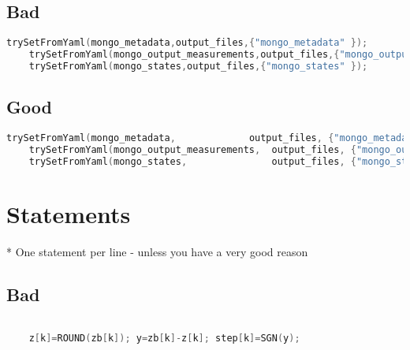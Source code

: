 
\subsection{Bad}

\begin{lstlisting}[language=c++]
    trySetFromYaml(mongo_metadata,output_files,{"mongo_metadata" });
    trySetFromYaml(mongo_output_measurements,output_files,{"mongo_output_measurements" });
    trySetFromYaml(mongo_states,output_files,{"mongo_states" });
\end{lstlisting}

\subsection{Good}
\begin{lstlisting}[language=c++]
    trySetFromYaml(mongo_metadata,             output_files, {"mongo_metadata"              });
    trySetFromYaml(mongo_output_measurements,  output_files, {"mongo_output_measurements"	});
    trySetFromYaml(mongo_states,               output_files, {"mongo_states"		        });
\end{lstlisting}

\section{Statements}

* One statement per line  - \*unless you have a very good reason

\subsection{Bad}
\begin{lstlisting}[language=c++]

    z[k]=ROUND(zb[k]); y=zb[k]-z[k]; step[k]=SGN(y);
\end{lstlisting}

